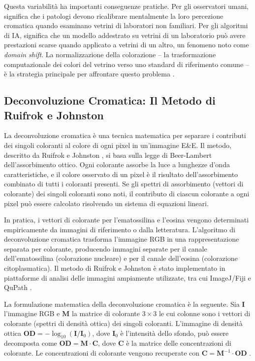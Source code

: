 Questa variabilità ha importanti conseguenze pratiche. Per gli osservatori umani, significa che i
patologi devono ricalibrare mentalmente la loro percezione cromatica quando esaminano vetrini di
laboratori non familiari. Per gli algoritmi di IA, significa che un modello addestrato su vetrini
di un laboratorio può avere prestazioni scarse quando applicato a vetrini di un altro, un
fenomeno noto come \emph{domain shift}. La normalizzazione della colorazione -- la trasformazione
computazionale dei colori del vetrino verso uno standard di riferimento comune -- è la strategia
principale per affrontare questo problema \cite{tellez2019}.

\subsection{Deconvoluzione Cromatica: Il Metodo di Ruifrok e Johnston}

La deconvoluzione cromatica è una tecnica matematica per separare i contributi dei singoli
coloranti al colore di ogni pixel in un'immagine E\&E. Il metodo, descritto da Ruifrok e Johnston
\cite{ruifrok2001}, si basa sulla legge di Beer-Lambert dell'assorbimento ottico. Ogni colorante
assorbe la luce a lunghezze d'onda caratteristiche, e il colore osservato di un pixel è il
risultato dell'assorbimento combinato di tutti i coloranti presenti. Se gli spettri di
assorbimento (vettori di colorante) dei singoli coloranti sono noti, il contributo di ciascun
colorante a ogni pixel può essere calcolato risolvendo un sistema di equazioni lineari.

In pratica, i vettori di colorante per l'ematossilina e l'eosina vengono determinati
empiricamente da immagini di riferimento o dalla letteratura. L'algoritmo di deconvoluzione
cromatica trasforma l'immagine RGB in una rappresentazione separata per colorante, producendo
immagini separate per il canale dell'ematossilina (colorazione nucleare) e per il canale
dell'eosina (colorazione citoplasmatica). Il metodo di Ruifrok e Johnston è stato implementato in
piattaforme di analisi delle immagini ampiamente utilizzate, tra cui ImageJ/Fiji e QuPath
\cite{bankhead2017}.

La formulazione matematica della deconvoluzione cromatica è la seguente. Sia $\mathbf{I}$
l'immagine RGB e $\mathbf{M}$ la matrice di colorante $3 \times 3$ le cui colonne sono i vettori
di colorante (spettri di densità ottica) dei singoli coloranti. L'immagine di densità ottica
$\mathbf{OD} = -\log_{10}(\mathbf{I}/\mathbf{I}_0)$, dove $\mathbf{I}_0$ è l'intensità dello
sfondo, può essere decomposta come $\mathbf{OD} = \mathbf{M} \cdot \mathbf{C}$, dove
$\mathbf{C}$ è la matrice delle concentrazioni di colorante. Le concentrazioni di colorante
vengono recuperate con $\mathbf{C} = \mathbf{M}^{-1} \cdot \mathbf{OD}$ \cite{ruifrok2001}.

